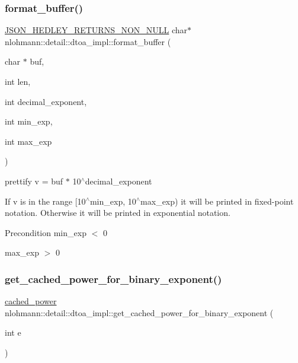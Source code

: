 \subsubsection{\texorpdfstring{format\_buffer()}{format\_buffer()}}
{\footnotesize\ttfamily \mbox{\hyperlink{json_8hpp_a5f2aaec3b681d0a72f7d6e90b70cdcd1}{J\+S\+O\+N\+\_\+\+H\+E\+D\+L\+E\+Y\+\_\+\+R\+E\+T\+U\+R\+N\+S\+\_\+\+N\+O\+N\+\_\+\+N\+U\+LL}} char$\ast$ nlohmann\+::detail\+::dtoa\+\_\+impl\+::format\+\_\+buffer (\begin{DoxyParamCaption}\item[{char $\ast$}]{buf,  }\item[{int}]{len,  }\item[{int}]{decimal\+\_\+exponent,  }\item[{int}]{min\+\_\+exp,  }\item[{int}]{max\+\_\+exp }\end{DoxyParamCaption})\hspace{0.3cm}{\ttfamily [inline]}}



prettify v = buf $\ast$ 10$^\wedge$decimal\+\_\+exponent 

If v is in the range \mbox{[}10$^\wedge$min\+\_\+exp, 10$^\wedge$max\+\_\+exp) it will be printed in fixed-\/point notation. Otherwise it will be printed in exponential notation.

\begin{DoxyPrecond}{Precondition}
min\+\_\+exp $<$ 0 

max\+\_\+exp $>$ 0 
\end{DoxyPrecond}
\mbox{\label{namespacenlohmann_1_1detail_1_1dtoa__impl_adbf329a18c5cf854a3477327afd2200b}} 
\subsubsection{\texorpdfstring{get\_cached\_power\_for\_binary\_exponent()}{get\_cached\_power\_for\_binary\_exponent()}}
{\footnotesize\ttfamily \mbox{\hyperlink{structnlohmann_1_1detail_1_1dtoa__impl_1_1cached__power}{cached\+\_\+power}} nlohmann\+::detail\+::dtoa\+\_\+impl\+::get\+\_\+cached\+\_\+power\+\_\+for\+\_\+binary\+\_\+exponent (\begin{DoxyParamCaption}\item[{int}]{e }\end{DoxyParamCaption})\hspace{0.3cm}{\ttfamily [inline]}}

